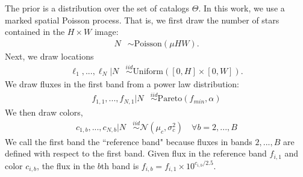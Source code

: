 The prior is a distribution over the set of catalogs $\Theta$. In this work, we use a marked spatial Poisson process. That is, we first draw the number of stars contained in the $H\times W$ image:
\begin{align}
	N &\sim \text{Poisson}(\mu HW).
\end{align}
Next, we draw locations
\begin{align}
  \ell_1, ..., \ell_N | N &\stackrel{iid}{\sim} \text{Uniform}([0, H] \times [0, W]). 
 \end{align}
We draw fluxes in the first band from a power law distribution:
\begin{align}
    f_{1, 1}, ..., f_{N,1} | N & 
    \stackrel{iid}{\sim} \text{Pareto}(f_{min}, \alpha) 
    \label{eq:flux_prior}
\end{align}
We then draw colors,
\begin{align}
  c_{1, b}, ..., c_{N,b} | N  & 
      \stackrel{iid}{\sim} \mathcal{N}(\mu_c, \sigma^2_c) \quad \forall b = 2, ..., B
\end{align}
We call the first band the ``reference band" because fluxes in bands $2, ..., B$ are defined with respect to the first band. Given flux in the reference band $f_{i,1}$ and color $c_{i,b}$,
the flux in the $b$th band is  $f_{i,b} = f_{i,1} \times 10^{c_{i,b} / 2.5}$.




